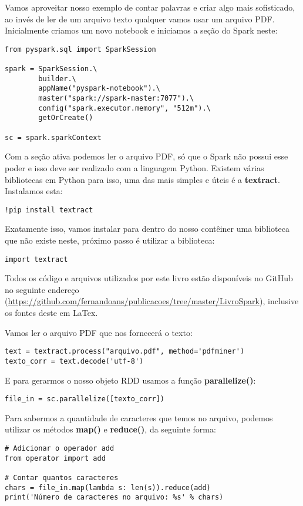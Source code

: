 Vamos aproveitar nosso exemplo de contar palavras e criar algo mais sofisticado, ao invés de ler de um arquivo texto qualquer vamos usar um arquivo PDF. Inicialmente criamos um novo notebook e iniciamos a seção do Spark neste:
\begin{lstlisting}[]
from pyspark.sql import SparkSession

spark = SparkSession.\
        builder.\
        appName("pyspark-notebook").\
        master("spark://spark-master:7077").\
        config("spark.executor.memory", "512m").\
        getOrCreate()
        
sc = spark.sparkContext        
\end{lstlisting}

Com a seção ativa podemos ler o arquivo PDF, só que o Spark não possui esse poder e isso deve ser realizado com a linguagem Python. Existem várias bibliotecas em Python para isso, uma das mais simples e úteis é a \textbf{textract}. Instalamos esta:
\begin{lstlisting}[]
!pip install textract
\end{lstlisting}

Exatamente isso, vamos instalar para dentro do nosso contêiner uma biblioteca que não existe neste, próximo passo é utilizar a biblioteca:
\begin{lstlisting}[]
import textract
\end{lstlisting}

\begin{note}[Onde está o PDF?] 
	Todos os código e arquivos utilizados por este livro estão disponíveis no GitHub no seguinte endereço (\url{https://github.com/fernandoans/publicacoes/tree/master/LivroSpark}), inclusive os fontes deste em LaTex.
\end{note}

Vamos ler o arquivo PDF que nos fornecerá o texto:
\begin{lstlisting}[]
text = textract.process("arquivo.pdf", method='pdfminer')
texto_corr = text.decode('utf-8')
\end{lstlisting}

E para gerarmos o nosso objeto RDD usamos a função \textbf{parallelize()}:
\begin{lstlisting}[]
file_in = sc.parallelize([texto_corr])
\end{lstlisting}

Para sabermos a quantidade de caracteres que temos no arquivo, podemos utilizar os métodos \textbf{map()} e \textbf{reduce()}, da seguinte forma:
\begin{lstlisting}[]
# Adicionar o operador add
from operator import add

# Contar quantos caracteres
chars = file_in.map(lambda s: len(s)).reduce(add)
print('Número de caracteres no arquivo: %s' % chars)
\end{lstlisting}

